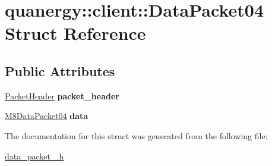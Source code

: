 \hypertarget{structquanergy_1_1client_1_1DataPacket04}{\section{quanergy\-:\-:client\-:\-:Data\-Packet04 Struct Reference}
\label{structquanergy_1_1client_1_1DataPacket04}
}
\subsection*{Public Attributes}
\begin{DoxyCompactItemize}
\item 
\hypertarget{structquanergy_1_1client_1_1DataPacket04_a493cfa4c7a75aac92cb0506794a7c032}{\hyperlink{structquanergy_1_1client_1_1PacketHeader}{Packet\-Header} {\bfseries packet\-\_\-header}}\label{structquanergy_1_1client_1_1DataPacket04_a493cfa4c7a75aac92cb0506794a7c032}

\item 
\hypertarget{structquanergy_1_1client_1_1DataPacket04_a8df477721ef5ffb148c2d34f47d40f31}{\hyperlink{structquanergy_1_1client_1_1M8DataPacket04}{M8\-Data\-Packet04} {\bfseries data}}\label{structquanergy_1_1client_1_1DataPacket04_a8df477721ef5ffb148c2d34f47d40f31}

\end{DoxyCompactItemize}


The documentation for this struct was generated from the following file\-:\begin{DoxyCompactItemize}
\item 
\hyperlink{data__packet__04_8h}{data\-\_\-packet\-\_.\-h}\end{DoxyCompactItemize}
